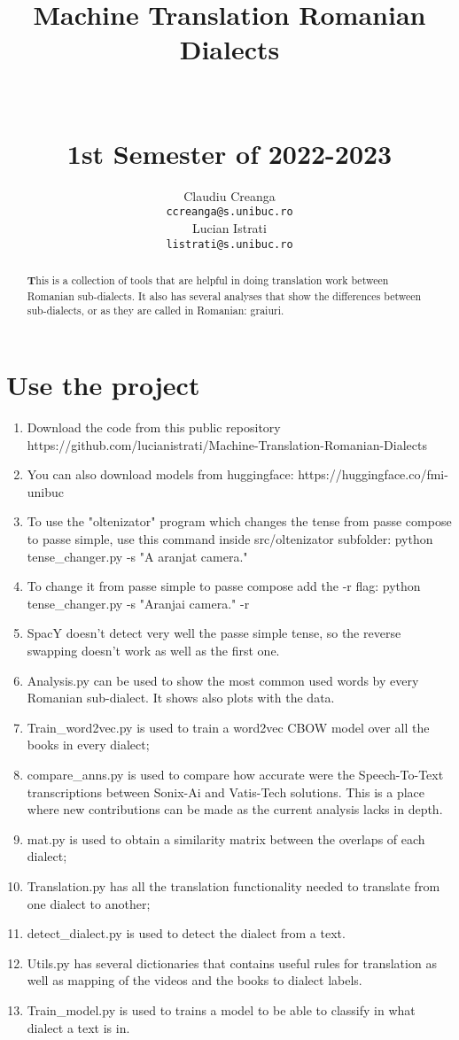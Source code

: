 \documentclass[11pt]{article}
\title{Machine Translation Romanian Dialects \\
		\hfill \\
		\hfill \\
		\small{1st Semester of 2022-2023}}
\author{Claudiu Creanga \\
  \texttt{ccreanga@s.unibuc.ro} \\\And
  Lucian Istrati \\
  \texttt{listrati@s.unibuc.ro} \\}
\begin{document}
\maketitle
\begin{abstract}
\textbf This is a collection of tools that are helpful in doing translation work between Romanian sub-dialects.
It also has several analyses that show the differences between sub-dialects, or as they are called in Romanian: graiuri.
\end{abstract}


\section*{Use the project}
\begin{enumerate}
	\item Download the code from this public repository https://github.com/lucianistrati/Machine-Translation-Romanian-Dialects
	\item You can also download models from huggingface: https://huggingface.co/fmi-unibuc
	\item To use the "oltenizator" program which changes the tense from passe compose to passe simple, use this command inside {src/oltenizator} subfolder: python {tense\_changer.py -s "A aranjat camera."}
	\item To change it from passe simple to passe compose add the -r flag: {python tense\_changer.py -s "Aranjai camera." -r }
	\item SpacY doesn't detect very well the passe simple tense, so the reverse swapping doesn't work as well as the first one.
	\item {Analysis.py} can be used to show the most common used words by every Romanian sub-dialect. It shows also plots with the data.
	\item {Train\_word2vec.py} is used to train a word2vec CBOW model over all the books in every dialect;
	\item {compare\_anns.py	} is used to compare how accurate were the Speech-To-Text transcriptions between Sonix-Ai and Vatis-Tech solutions. This is a place where new contributions can be made as the current analysis lacks in depth.
 	\item mat.py is used to obtain a similarity matrix between the overlaps of each dialect;
  	\item Translation.py has all the translation functionality needed to translate from one dialect to another;
   	\item {detect\_dialect.py} is used to detect the dialect from a text.
        \item Utils.py has several dictionaries that contains useful rules for translation as well as mapping of the videos and the books to dialect labels.
        \item {Train\_model.py} is used to trains a model to be able to classify in what dialect a text is in.
\end{enumerate}
\end{document}
